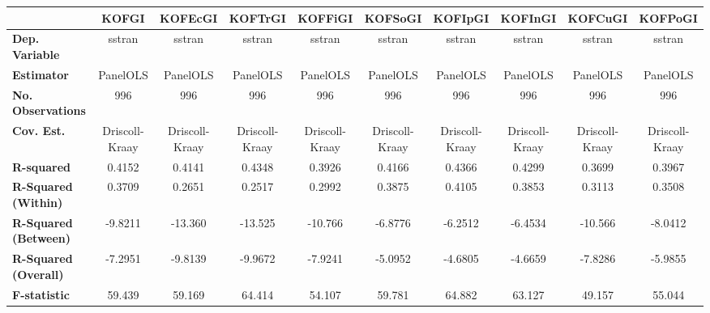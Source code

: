 \begin{center}
\begin{tabular}{lccccccccc}
\toprule
                                   &   \textbf{KOFGI}   &  \textbf{KOFEcGI}  &  \textbf{KOFTrGI}  &  \textbf{KOFFiGI}  &  \textbf{KOFSoGI}  &  \textbf{KOFIpGI}  &  \textbf{KOFInGI}  &  \textbf{KOFCuGI}  &  \textbf{KOFPoGI}   \\
\midrule
\textbf{Dep. Variable}             &       sstran       &       sstran       &       sstran       &       sstran       &       sstran       &       sstran       &       sstran       &       sstran       &       sstran        \\
\textbf{Estimator}                 &      PanelOLS      &      PanelOLS      &      PanelOLS      &      PanelOLS      &      PanelOLS      &      PanelOLS      &      PanelOLS      &      PanelOLS      &      PanelOLS       \\
\textbf{No. Observations}          &        996         &        996         &        996         &        996         &        996         &        996         &        996         &        996         &        996          \\
\textbf{Cov. Est.}                 &   Driscoll-Kraay   &   Driscoll-Kraay   &   Driscoll-Kraay   &   Driscoll-Kraay   &   Driscoll-Kraay   &   Driscoll-Kraay   &   Driscoll-Kraay   &   Driscoll-Kraay   &   Driscoll-Kraay    \\
\textbf{R-squared}                 &       0.4152       &       0.4141       &       0.4348       &       0.3926       &       0.4166       &       0.4366       &       0.4299       &       0.3699       &       0.3967        \\
\textbf{R-Squared (Within)}        &       0.3709       &       0.2651       &       0.2517       &       0.2992       &       0.3875       &       0.4105       &       0.3853       &       0.3113       &       0.3508        \\
\textbf{R-Squared (Between)}       &      -9.8211       &      -13.360       &      -13.525       &      -10.766       &      -6.8776       &      -6.2512       &      -6.4534       &      -10.566       &      -8.0412        \\
\textbf{R-Squared (Overall)}       &      -7.2951       &      -9.8139       &      -9.9672       &      -7.9241       &      -5.0952       &      -4.6805       &      -4.6659       &      -7.8286       &      -5.9855        \\
\textbf{F-statistic}               &       59.439       &       59.169       &       64.414       &       54.107       &       59.781       &       64.882       &       63.127       &       49.157       &       55.044        \\

\end{tabular}
\end{center}
